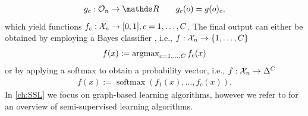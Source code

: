 %
\begin{align*}
g_c:\conset_n\to\R\qquad g_c(o) = g(o)_c,
\end{align*}
%
which yield functions $f_c:\mathcal{X}_n\to[0,1],c=1,\ldots,C$. The final output can either be obtained by employing a Bayes classifier \cite{devroye2013probabilistic}, i.e., $f:\mathcal{X}_n\to\{1,\ldots, C\}$ 
%
\begin{align*}
f(x) := \operatorname{argmax}_{c=1,\ldots, C} f_c(x)
\end{align*}
%
or by applying a softmax to obtain a probability vector, i.e., $f:\mathcal{X}_n\to\Delta^C$ 
%
\begin{align*}
f(x) := \operatorname{soft max}\left(f_1(x), \ldots, f_c(x)\right).
\end{align*}
%
In \cref{ch:SSL} we focus on graph-based learning algorithms, however we refer to \cite{zhu2005semi} for an overview of semi-supervised learning algorithms. 
